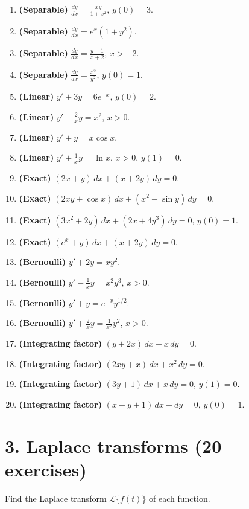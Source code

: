 \documentclass[11pt,a4paper]{article}
\newcommand{\workspace}{\vspace{2.2cm}}
\begin{document}
\begin{enumerate}
    \item \textbf{(Separable)} $\displaystyle \frac{dy}{dx}=\frac{xy}{1+x^2}$, \quad $y(0)=3$.\workspace
    \item \textbf{(Separable)} $\displaystyle \frac{dy}{dx}=e^x(1+y^2)$.\workspace
    \item \textbf{(Separable)} $\displaystyle \frac{dy}{dx}=\frac{y-1}{x+2}$, \quad $x>-2$.\workspace
    \item \textbf{(Separable)} $\displaystyle \frac{dy}{dx}=\frac{x^2}{y^2}$, \quad $y(0)=1$.\workspace
    \item \textbf{(Linear)} $y'+3y=6e^{-x}$, \quad $y(0)=2$.\workspace
    \item \textbf{(Linear)} $y'-\frac{2}{x}y=x^2$, \quad $x>0$.\workspace
    \item \textbf{(Linear)} $y'+y=x\cos x$.\workspace
    \item \textbf{(Linear)} $y'+\frac{1}{x}y=\ln x$, \quad $x>0$, \quad $y(1)=0$.\workspace
    \item \textbf{(Exact)} $(2x+y)\,dx+(x+2y)\,dy=0$.\workspace
    \item \textbf{(Exact)} $(2xy+\cos x)\,dx+(x^2-\sin y)\,dy=0$.\workspace
    \item \textbf{(Exact)} $(3x^2+2y)\,dx+(2x+4y^3)\,dy=0$, \quad $y(0)=1$.\workspace
    \item \textbf{(Exact)} $(e^x+y)\,dx+(x+2y)\,dy=0$.\workspace
    \item \textbf{(Bernoulli)} $y'+2y=xy^2$.\workspace
    \item \textbf{(Bernoulli)} $y'-\frac{1}{x}y=x^2 y^3$, \quad $x>0$.\workspace
    \item \textbf{(Bernoulli)} $y'+y=e^{-x}y^{1/2}$.\workspace
    \item \textbf{(Bernoulli)} $y'+\frac{2}{x}y=\frac{1}{x^2}y^2$, \quad $x>0$.\workspace
    \item \textbf{(Integrating factor)} $(y+2x)\,dx+x\,dy=0$.\workspace
    \item \textbf{(Integrating factor)} $(2xy+x)\,dx+x^2\,dy=0$.\workspace
    \item \textbf{(Integrating factor)} $(3y+1)\,dx+x\,dy=0$, \quad $y(1)=0$.\workspace
    \item \textbf{(Integrating factor)} $(x+y+1)\,dx+dy=0$, \quad $y(0)=1$.\workspace
\end{enumerate}

\section*{3. Laplace transforms (20 exercises)}
Find the Laplace transform $\mathcal{L}\{f(t)\}$ of each function.
\end{document}
